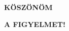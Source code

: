\documentclass{beamer}
\begin{document}

{
%
\begin{frame}{}

\textbf{\huge\color{white} KÖSZÖNÖM}

\bigskip

\textbf{\huge\color{white} A FIGYELMET!}

\end{frame}
}
\end{document}
